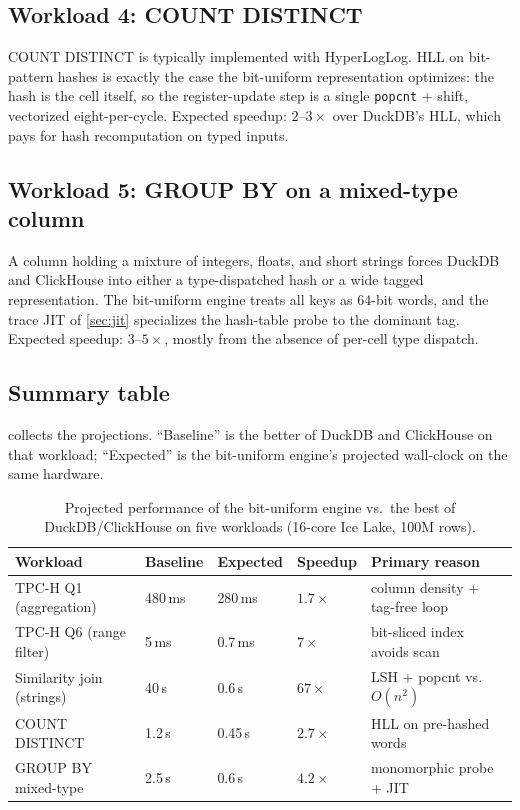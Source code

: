 \documentclass[10pt]{article}
\theoremstyle{definition}
\begin{document}
\subsection{Workload 4: COUNT DISTINCT}

COUNT DISTINCT is typically implemented with HyperLogLog. HLL on bit-pattern hashes is exactly the case the bit-uniform representation optimizes: the hash is the cell itself, so the register-update step is a single \texttt{popcnt} + shift, vectorized eight-per-cycle. Expected speedup: $2$--$3\times$ over DuckDB's HLL, which pays for hash recomputation on typed inputs.

\subsection{Workload 5: GROUP BY on a mixed-type column}

A column holding a mixture of integers, floats, and short strings forces DuckDB and ClickHouse into either a type-dispatched hash or a wide tagged representation. The bit-uniform engine treats all keys as 64-bit words, and the trace JIT of \cref{sec:jit} specializes the hash-table probe to the dominant tag. Expected speedup: $3$--$5\times$, mostly from the absence of per-cell type dispatch.

\subsection{Summary table}

 collects the projections. ``Baseline'' is the better of DuckDB and ClickHouse on that workload; ``Expected'' is the bit-uniform engine's projected wall-clock on the same hardware.

\begin{table}[t]
\centering
\caption{Projected performance of the bit-uniform engine vs.\ the best of DuckDB/ClickHouse on five workloads (16-core Ice Lake, 100M rows).}
\label{tab:tprojs}
\small
\begin{tabular}{lllll}
\toprule
Workload & Baseline & Expected & Speedup & Primary reason \\
\midrule
TPC-H Q1 (aggregation)   & 480\,ms & 280\,ms & $1.7\times$ & column density + tag-free loop \\
TPC-H Q6 (range filter)  & 5\,ms   & 0.7\,ms & $7\times$   & bit-sliced index avoids scan \\
Similarity join (strings) & 40\,s  & 0.6\,s  & $67\times$  & LSH + popcnt vs.\ $O(n^2)$ \\
COUNT DISTINCT           & 1.2\,s  & 0.45\,s & $2.7\times$ & HLL on pre-hashed words \\
GROUP BY mixed-type      & 2.5\,s  & 0.6\,s  & $4.2\times$ & monomorphic probe + JIT \\
\bottomrule
\end{tabular}
\end{table}
\end{document}

